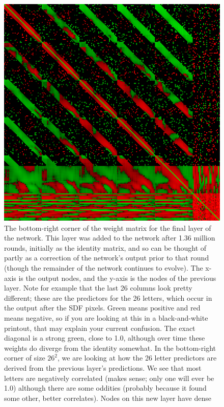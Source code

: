 \documentclass[twocolumn]{article}
\begin{document}
\begin{figure}[ht!b]
\centering
  \includegraphics[width=0.99 \linewidth]{lastlayer}
  \caption{ The bottom-right corner of the weight matrix for the final
    layer of the network. This layer was added to the network after
    1.36 million rounds, initially as the identity matrix, and so can
    be thought of partly as a correction of the network's output prior
    to that round (though the remainder of the network continues to
    evolve). The x-axis is the output nodes, and the y-axis is the
    nodes of the previous layer. Note for example that the last 26
    columns look pretty different; these are the predictors for the 26
    letters, which occur in the output after the SDF pixels. Green
    means positive and red means negative, so if you are looking at
    this in a black-and-white printout, that may explain your current
    confusion. The exact diagonal is a strong green, close to 1.0,
    although over time these weights do diverge from the identity
    somewhat. In the bottom-right corner of size $26^2$, we are
    looking at how the 26 letter predictors are derived from the
    previous layer's predictions. We see that most letters are
    negatively correlated (makes sense; only one will ever be 1.0)
    although there are some oddities (probably because it found some
    other, better correlates). Nodes on this new layer have dense
}
\end{figure}
\end{document}
